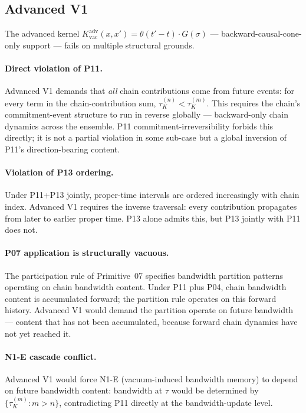 \documentclass[11pt,a4paper]{article}
\begin{document}
\subsection{Advanced V1}

The advanced kernel $K_\mathrm{vac}^\mathrm{adv}(x, x') = \theta(t' - t) \cdot G(\sigma)$ --- backward-causal-cone-only support --- fails on multiple structural grounds.

\paragraph{Direct violation of P11.} Advanced V1 demands that \emph{all} chain contributions come from future events: for every term in the chain-contribution sum, $\tau_K^{(n)} < \tau_K^{(m)}$. This requires the chain's commitment-event structure to run in reverse globally --- backward-only chain dynamics across the ensemble. P11 commitment-irreversibility forbids this directly; it is not a partial violation in some sub-case but a global inversion of P11's direction-bearing content.

\paragraph{Violation of P13 ordering.} Under P11+P13 jointly, proper-time intervals are ordered increasingly with chain index. Advanced V1 requires the inverse traversal: every contribution propagates from later to earlier proper time. P13 alone admits this, but P13 jointly with P11 does not.

\paragraph{P07 application is structurally vacuous.} The participation rule of Primitive~07 specifies bandwidth partition patterns operating on chain bandwidth content. Under P11 plus P04, chain bandwidth content is accumulated forward; the partition rule operates on this forward history. Advanced V1 would demand the partition operate on future bandwidth --- content that has not been accumulated, because forward chain dynamics have not yet reached it.

\paragraph{N1-E cascade conflict.} Advanced V1 would force N1-E (vacuum-induced bandwidth memory) to depend on future bandwidth content: bandwidth at $\tau$ would be determined by $\{\tau_K^{(m)} : m > n\}$, contradicting P11 directly at the bandwidth-update level.
\end{document}
